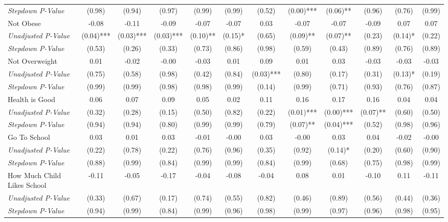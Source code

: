 \begin{tabular}{l c c c c c c c c c c c}
\quad \textit{Stepdown P-Value} & (0.98) & (0.94) & (0.97) & (0.99) & (0.99) & (0.52) & (0.00)*** & (0.06)** & (0.96) & (0.76) & (0.99) \\
Not Obese & -0.08 & -0.11 & -0.09 & -0.07 & -0.07 & 0.03 & -0.07 & -0.07 & -0.09 & 0.07 & 0.07 \\
\quad \textit{Unadjusted P-Value} & (0.04)*** & (0.03)*** & (0.03)*** & (0.10)** & (0.15)* & (0.65) & (0.09)** & (0.07)** & (0.23) & (0.14)* & (0.22) \\
\quad \textit{Stepdown P-Value} & (0.53) & (0.26) & (0.33) & (0.73) & (0.86) & (0.98) & (0.59) & (0.43) & (0.89) & (0.76) & (0.89) \\
Not Overweight & 0.01 & -0.02 & -0.00 & -0.03 & 0.01 & 0.09 & 0.01 & 0.03 & -0.03 & -0.03 & -0.03 \\
\quad \textit{Unadjusted P-Value} & (0.75) & (0.58) & (0.98) & (0.42) & (0.84) & (0.03)*** & (0.80) & (0.17) & (0.31) & (0.13)* & (0.19) \\
\quad \textit{Stepdown P-Value} & (0.99) & (0.99) & (0.98) & (0.98) & (0.99) & (0.14) & (0.99) & (0.71) & (0.93) & (0.76) & (0.87) \\
Health is Good & 0.06 & 0.07 & 0.09 & 0.05 & 0.02 & 0.11 & 0.16 & 0.17 & 0.16 & 0.04 & 0.04 \\
\quad \textit{Unadjusted P-Value} & (0.32) & (0.28) & (0.15) & (0.50) & (0.82) & (0.22) & (0.01)*** & (0.00)*** & (0.07)** & (0.60) & (0.50) \\
\quad \textit{Stepdown P-Value} & (0.94) & (0.94) & (0.80) & (0.99) & (0.99) & (0.79) & (0.07)** & (0.04)*** & (0.52) & (0.98) & (0.96) \\
Go To School & 0.03 & 0.01 & 0.03 & -0.01 & -0.00 & 0.03 & -0.00 & 0.03 & 0.04 & -0.02 & -0.00 \\
\quad \textit{Unadjusted P-Value} & (0.22) & (0.78) & (0.22) & (0.76) & (0.96) & (0.35) & (0.92) & (0.14)* & (0.20) & (0.60) & (0.90) \\
\quad \textit{Stepdown P-Value} & (0.88) & (0.99) & (0.84) & (0.99) & (0.99) & (0.84) & (0.99) & (0.68) & (0.75) & (0.98) & (0.99) \\
How Much Child Likes School & -0.11 & -0.05 & -0.17 & -0.04 & -0.08 & -0.04 & 0.08 & 0.01 & -0.10 & 0.11 & -0.11 \\
\quad \textit{Unadjusted P-Value} & (0.33) & (0.67) & (0.17) & (0.74) & (0.55) & (0.82) & (0.46) & (0.89) & (0.56) & (0.44) & (0.36) \\
\quad \textit{Stepdown P-Value} & (0.94) & (0.99) & (0.84) & (0.99) & (0.96) & (0.98) & (0.99) & (0.97) & (0.96) & (0.98) & (0.95) \\

\end{tabular}
